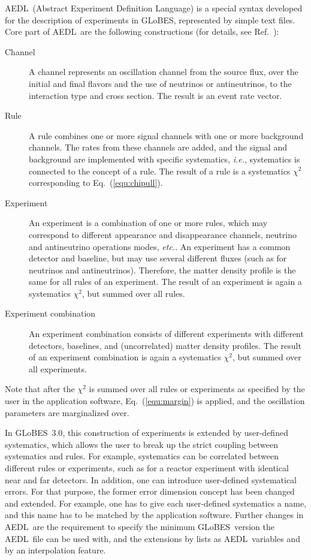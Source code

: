\documentclass[12pt,a4paper]{article}
\newcommand{\ie}{{\it i.e.}}
\newcommand{\etc}{{\it etc.}}
\newcommand{\eq}{Eq.}
\newcommand{\Ref}{Ref.}
\newcommand{\GLOBES}{{\sf GLoBES}}
\newcommand{\GLOBESN}{{\sf GLoBES~3.0}}
\newcommand{\AEDL}{{\sf AEDL}}
\newcommand{\equ}[1]{\eq~(\ref{equ:#1})}
\begin{document}
\AEDL\ (Abstract Experiment Definition Language) is a special syntax developed for the description of
experiments in \GLOBES, represented by simple text files. Core part of \AEDL\ are the following constructions
(for details, see \Ref~\cite{Manual}):
\begin{description}
\item[Channel] A channel represents an oscillation channel from the source flux, over the initial and final
flavors and the use of neutrinos or antineutrinos, to the interaction type and cross section. The result
is an event rate vector.
\item[Rule] A rule combines one or more signal channels with one or more background channels. The rates
from these channels are added, and the signal and background are implemented with specific systematics, \ie,
systematics is connected to the concept of a rule.
The result of a rule is a systematics $\chi^2$ corresponding to \equ{chipull}.
\item[Experiment] An experiment is a combination of one or more rules, which may correspond to different
appearance and disappearance channels, neutrino and antineutrino operations modes, \etc. An experiment has a common detector and baseline, but may use several different fluxes (such as for neutrinos and antineutrinos). Therefore,
the matter density profile is the same for all rules of an experiment. The result of an experiment
is again a systematics $\chi^2$, but summed over all rules.
\item[Experiment combination] An experiment combination consists of different experiments with different detectors, baselines, and (uncorrelated) matter density profiles. The result of an experiment combination
is again a systematics $\chi^2$, but summed over all experiments.
\end{description}
Note that after the $\chi^2$ is summed over all rules or experiments as specified by the user in the application software, \equ{margin} is applied, and the oscillation parameters are marginalized over. 

In \GLOBESN , this construction of experiments is extended by user-defined systematics, which allows
the user to break up the strict coupling between systematics and rules. For example, systematics can be
correlated between different rules or experiments, such as for a reactor experiment with identical
near and far detectors. In addition, one can introduce user-defined systematical errors.
For that purpose, the former error dimension concept has been changed and
extended. For example, one has to give each user-defined systematics a name, and this name has
to be matched by the application software. 
%
Further changes in \AEDL\ are the requirement to specify the minimum \GLOBES\ version the \AEDL\ file can be used with,
and the extensions by lists as \AEDL\ variables and by an interpolation feature.
\end{document}
